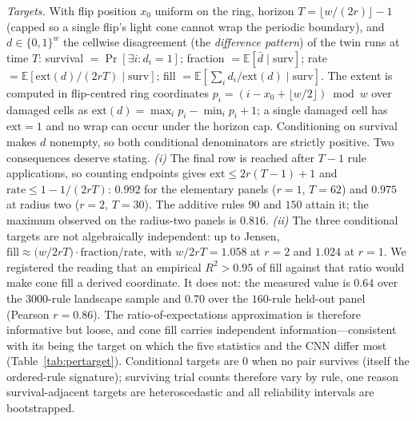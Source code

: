 \documentclass[aip,cha,amsmath,amssymb,reprint,floatfix]{revtex4-2}
\begin{document}
\emph{Targets.} With flip position $x_0$ uniform on the ring, horizon
$T=\lfloor w/(2r)\rfloor-1$ (capped so a single flip's light cone cannot wrap
the periodic boundary), and $d\in\{0,1\}^w$ the cellwise disagreement (the
\emph{difference pattern}) of the twin runs at time $T$:
survival $=\Pr[\exists i: d_i=1]$; fraction $=\mathbb{E}[\bar d\mid\text{surv}]$;
rate $=\mathbb{E}[\mathrm{ext}(d)/(2rT)\mid\text{surv}]$; fill
$=\mathbb{E}[\sum_i d_i/\mathrm{ext}(d)\mid\text{surv}]$. The extent is
computed in flip-centred ring coordinates
$p_i=(i-x_0+\lfloor w/2\rfloor)\bmod w$ over damaged cells as
$\mathrm{ext}(d)=\max_i p_i-\min_i p_i+1$; a single damaged cell has
$\mathrm{ext}=1$ and no wrap can occur under the horizon cap. Conditioning on
survival makes $d$ nonempty, so both conditional denominators are strictly
positive. Two consequences deserve stating.
\emph{(i)} The final row is reached after $T-1$ rule applications, so
counting endpoints gives $\mathrm{ext}\le 2r(T-1)+1$ and
$\text{rate}\le 1-1/(2rT)$: $0.992$ for the elementary panels ($r=1$,
$T=62$) and $0.975$ at radius two ($r=2$, $T=30$). The additive rules $90$
and $150$ attain it; the maximum observed on the radius-two panels
is $0.816$. \emph{(ii)} The three conditional targets are not algebraically
independent: up to Jensen, $\text{fill}\approx\bigl(w/2rT\bigr)\cdot
\text{fraction}/\text{rate}$, with $w/2rT=1.058$ at $r=2$ and $1.024$ at
$r=1$. We registered the reading that an empirical $R^2>0.95$ of fill
against that ratio would make cone fill a derived coordinate. It does not:
the measured value is $0.64$ over the $3000$-rule landscape sample and $0.70$
over the $160$-rule held-out panel (Pearson $r=0.86$). The ratio-of-expectations
approximation is therefore informative but loose, and cone fill carries
independent information---consistent with its being the target on which the
five statistics and the CNN differ most (Table~\ref{tab:pertarget}). Conditional targets
are $0$ when no pair survives (itself the ordered-rule signature); surviving
trial counts therefore vary by rule, one reason survival-adjacent targets are
heteroscedastic and all reliability intervals are bootstrapped.
\end{document}
